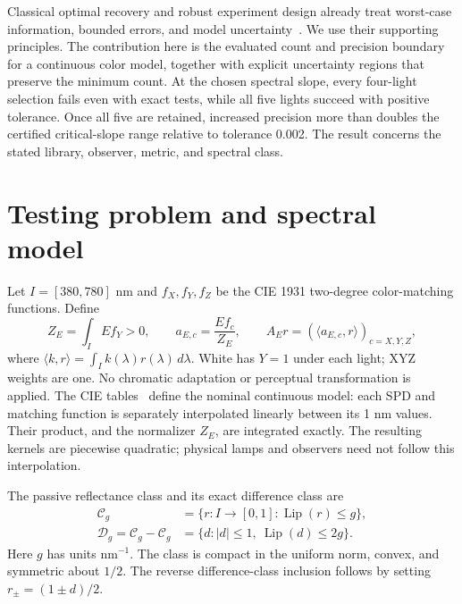 \documentclass{optica-article}
\newcommand{\Cg}{\mathcal C_g}
\newcommand{\Dg}{\mathcal D_g}
\newcommand{\ip}[2]{\langle #1,#2\rangle}
\begin{document}
Classical optimal recovery and robust experiment design already treat worst-case information, bounded errors, and model uncertainty~\cite{novak,tanaskovic,ettehad,foucart}. We use their supporting principles. The contribution here is the evaluated count and precision boundary for a continuous color model, together with explicit uncertainty regions that preserve the minimum count. At the chosen spectral slope, every four-light selection fails even with exact tests, while all five lights succeed with positive tolerance. Once all five are retained, increased precision more than doubles the certified critical-slope range relative to tolerance 0.002. The result concerns the stated library, observer, metric, and spectral class.

\section{Testing problem and spectral model}
Let $I=[380,780]$ nm and $f_X,f_Y,f_Z$ be the CIE 1931 two-degree color-matching functions. Define
\begin{equation}
 Z_E=\int_I E f_Y>0,\qquad a_{E,c}=\frac{E f_c}{Z_E},\qquad
 A_Er=(\ip{a_{E,c}}r)_{c=X,Y,Z},                 \label{eq:response}
\end{equation}
where $\ip kr=\int_I k(\lambda)r(\lambda)\,d\lambda$. White has $Y=1$ under each light; XYZ weights are one. No chromatic adaptation or perceptual transformation is applied. The CIE tables~\cite{ciexyz,ciea,cied65,ciefl} define the nominal continuous model: each SPD and matching function is separately interpolated linearly between its 1 nm values. Their product, and the normalizer $Z_E$, are integrated exactly. The resulting kernels are piecewise quadratic; physical lamps and observers need not follow this interpolation.

The passive reflectance class and its exact difference class are
\begin{align}
 \Cg&=\{r:I\to[0,1]:\operatorname{Lip}(r)\leq g\},\nonumber\\
 \Dg=\Cg-\Cg&=\{d:|d|\leq1,\ \operatorname{Lip}(d)\leq2g\}. \label{eq:class}
\end{align}
Here $g$ has units $\mathrm{nm}^{-1}$. The class is compact in the uniform norm, convex, and symmetric about $1/2$. The reverse difference-class inclusion follows by setting $r_\pm=(1\pm d)/2$.
\end{document}
